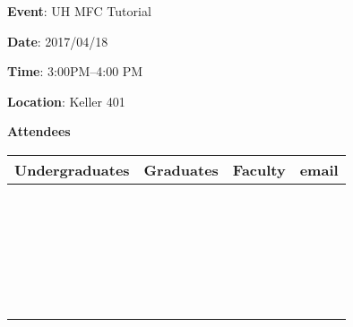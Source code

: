 \documentclass[11pt]{article}
\theoremstyle{definition}
\begin{document}
\Large

\noindent \textbf{Event}: UH MFC Tutorial

\medskip

\noindent \textbf{Date}: 2017/04/18

\medskip

\noindent \textbf{Time}: 3:00PM--4:00 PM

\medskip

\noindent \textbf{Location}: Keller 401

\bigskip

\begin{center}

\textbf{Attendees}

\medskip

\begin{tabularx}{\textwidth}{|l|X|X|X|}
  \hline
  \textbf{Undergraduates} & \textbf{Graduates} & \textbf{Faculty} & \textbf{email} \\
  \hline
  & & &  \\
  \hline
    & & &  \\
  \hline
    & & &  \\
  \hline
    & & &  \\
  \hline
    & & &  \\
  \hline
    & & &  \\
  \hline
    & & &  \\
  \hline
    & & &  \\
  \hline
    & & &  \\
  \hline
    & & &  \\
  \hline
    & & &  \\
  \hline
    & & &  \\
  \hline
    & & &  \\
  \hline
    & & &  \\
  \hline
    & & &  \\
  \hline
    & & &  \\
  \hline
    & & &  \\
  \hline
    & & &  \\
  \hline
    & & &  \\
  \hline
    & & &  \\
  \hline
    & & &  \\
  \hline
    & & &  \\
  \hline
    & & &  \\
  \hline
    & & &  \\
  \hline
    & & &  \\
  \hline
\end{tabularx}

\end{center}
\end{document}
